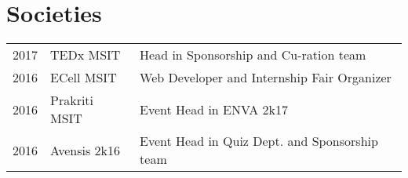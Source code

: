 \documentclass[]{deedy-resume-openfont}
\begin{document}
\begin{minipage}[t]{0.66\textwidth}

\section{Societies} 

\begin{tabular}{rll}
2017   &TEDx MSIT  & Head in Sponsorship and Cu-ration team\\
2016   &ECell MSIT   & Web Developer and Internship Fair Organizer\\
2016   &Prakriti MSIT   & Event Head in ENVA 2k17 \\
2016   &Avensis 2k16   & Event Head in Quiz Dept. and Sponsorship team\\
\end{tabular}
\sectionsep

\end{minipage} 
\end{document}
